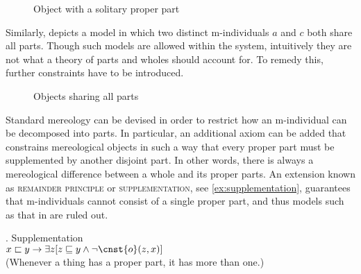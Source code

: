 \begin{figure}[h!]
\centering
{}
\caption{Object with a solitary proper part}
\label{fig:object-solitary-proper-part}
\end{figure}

Similarly,  depicts a model in which two distinct m-individuals $a$ and $c$ both share all parts. Though such models are allowed within the system, intuitively they are not what a theory of parts and wholes should account for. To remedy this, further constraints have to be introduced. 

\begin{figure}[h!]
\centering
{}
\caption{Objects sharing all parts}
\label{fig:objects-share-all-parts}
\end{figure}

Standard mereology can be devised in order to restrict how an m-individual can be decomposed into parts. In particular, an additional axiom can be added that constrains mereological objects in such a way that every proper part must be supplemented by another disjoint part. In other words, there is always a mereological difference between a whole and its proper parts. An extension known as \textsc{remainder principle} or \textsc{supplementation}, see \ref{ex:supplementation}, guarantees that m-individ\-uals cannot consist of a single proper part, and thus models such as that in   are ruled out.\largerpage[2]

\ex. Supplementation \citep[p. 36]{casati_varzi1999parts}\label{ex:supplementation}\\
$x \sqsubset y \rightarrow \exists z[z \sqsubseteq y \wedge \neg\cnst{o}(z,x)]$\\
(Whenever a thing has a proper part, it has more than one.)

